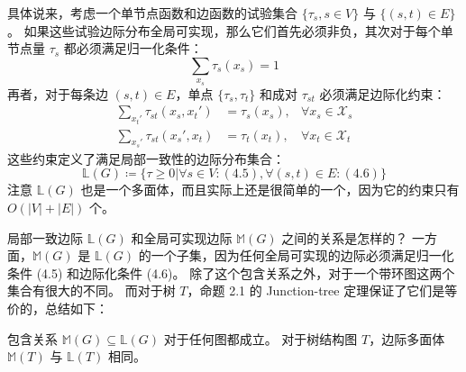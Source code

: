 具体说来，考虑一个单节点函数和边函数的试验集合 $\{\tau_s, s \in V\}$ 与 $\{(s, t) \in E\}$ 。
如果这些试验边际分布全局可实现，那么它们首先必须非负，其次对于每个单节点量 $\tau_s$ 都必须满足归一化条件：
\begin{equation}
    \sum_{x_s}\tau_s(x_s) = 1
\end{equation}
再者，对于每条边 $(s, t) \in E$，单点 $\{\tau_s, \tau_t\}$ 和成对 $\tau_{st}$ 必须满足边际化约束：
\begin{subequations}
\begin{align}
    \sum_{x_t'}\tau_{st}(x_s, x_t') &= \tau_s(x_s), &\forall x_s \in \mathcal{X}_s \\
    \sum_{x_s'}\tau_{st}(x_s', x_t) &= \tau_t(x_t), &\forall x_t \in \mathcal{X}_t
\end{align}
\end{subequations}
这些约束定义了满足局部一致性的边际分布集合：
\begin{equation}
    \mathbb{L}(G) \coloneqq \{\tau \geq 0| \forall s \in V: (4.5), \forall (s, t) \in E: (4.6)\}
\end{equation}
注意 $\mathbb{L}(G)$ 也是一个多面体，而且实际上还是很简单的一个，因为它的约束只有 $O(|V| + |E|)$ 个。

局部一致边际 $\mathbb{L}(G)$ 和全局可实现边际 $\mathbb{M}(G)$ 之间的关系是怎样的？
一方面，$\mathbb{M}(G)$ 是 $\mathbb{L}(G)$ 的一个子集，因为任何全局可实现的边际必须满足归一化条件 (4.5) 和边际化条件 (4.6)。
除了这个包含关系之外，对于一个带环图这两个集合有很大的不同。
而对于树 $T$，命题 2.1 的 Junction-tree 定理保证了它们是等价的，总结如下：

\begin{tcolorbox}
\begin{prop}
    包含关系 $\mathbb{M}(G) \subseteq \mathbb{L}(G)$ 对于任何图都成立。
    对于树结构图 $T$，边际多面体 $\mathbb{M}(T)$ 与 $\mathbb{L}(T)$ 相同。
\end{prop}
\end{tcolorbox}

